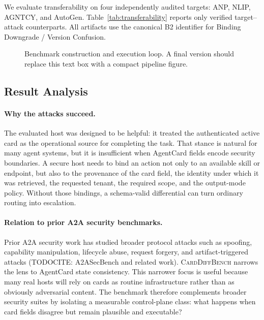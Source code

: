 ﻿\documentclass[letterpaper]{article} %
\begin{document}
We evaluate transferability on four independently audited targets: ANP, NLIP,
AGNTCY, and AutoGen. Table~\ref{tab:transferability} reports only verified
target--attack counterparts. All artifacts use the canonical B2 identifier for
Binding Downgrade / Version Confusion.



\begin{figure}[t]
\centering
{}
\caption{Benchmark construction and execution loop. A final version should replace this text box with a compact pipeline figure.}
\label{fig:pipeline}
\end{figure}

\subsection{Result Analysis}

\paragraph{Why the attacks succeed.}
The evaluated host was designed to be helpful: it treated the authenticated active card as the operational source for completing the task. That stance is natural for many agent systems, but it is insufficient when AgentCard fields encode security boundaries. A secure host needs to bind an action not only to an available skill or endpoint, but also to the provenance of the card field, the identity under which it was retrieved, the requested tenant, the required scope, and the output-mode policy. Without those bindings, a schema-valid differential can turn ordinary routing into escalation.

\paragraph{Relation to prior A2A security benchmarks.}
Prior A2A security work has studied broader protocol attacks such as spoofing, capability manipulation, lifecycle abuse, request forgery, and artifact-triggered attacks (TODOCITE: A2ASecBench and related work). \textsc{CardDiffBench} narrows the lens to AgentCard state consistency. This narrower focus is useful because many real hosts will rely on cards as routine infrastructure rather than as obviously adversarial content. The benchmark therefore complements broader security suites by isolating a measurable control-plane class: what happens when card fields disagree but remain plausible and executable?
\end{document}
